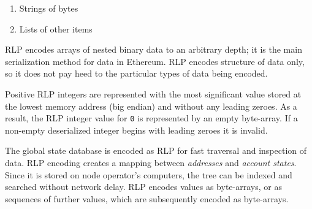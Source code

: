 \documentclass[10pt,letterpaper,leqno,bibliography=totoc]{scrartcl}
\newenvironment{alphafootnotes}
{\par\edef\savedfootnotenumber{\number\value{footnote}}
\renewcommand{\thefootnote}{\alph{footnote}}
\setcounter{footnote}{0}}
{\par\setcounter{footnote}{\savedfootnotenumber}}
\begin{document}
\begin{alphafootnotes}
\begin{multicols*}{2}
			\begin{enumerate}
				\item Strings of bytes
				\item Lists of other items						\end{enumerate}
				
				RLP encodes arrays of nested binary data to an arbitrary depth; it is the main serialization method for data in Ethereum. RLP encodes structure of data only, so it does not pay heed to the particular types of data being encoded. 

		Positive RLP integers are represented with the most significant value stored at the lowest memory address (big endian)  and without any leading zeroes. As a result, the RLP integer value for \texttt{0} is represented by an empty byte-array. If a non-empty deserialized integer begins with leading zeroes it is invalid.\supercite{EF2017}


			The global state database is encoded as RLP for fast traversal and inspection of data. RLP encoding creates a mapping between \textit{addresses} and \textit{account states}. Since it is stored on node operator's computers, the tree can be indexed and searched without network delay. RLP encodes values as byte-arrays, or as sequences of further values, which are subsequently encoded as byte-arrays. \supercite{Wood2017} 


%
			

\end{multicols*}
\end{alphafootnotes}
\end{document}
